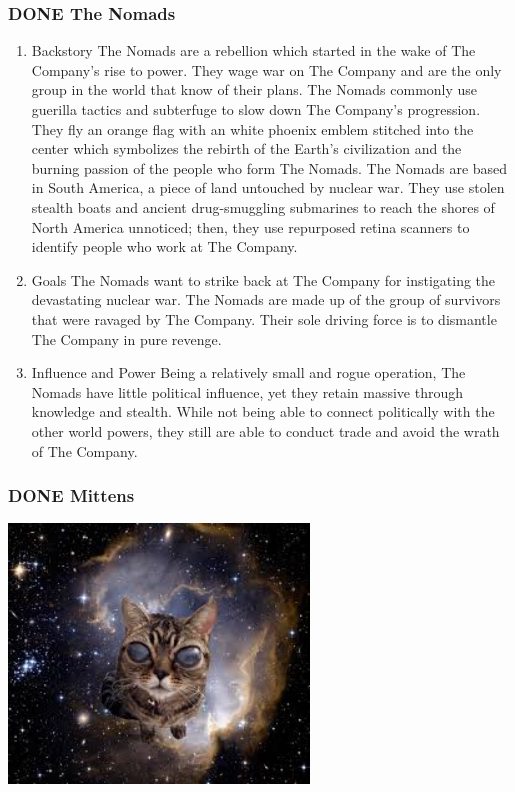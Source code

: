 \documentclass[11pt]{article}
\begin{document}
\subsubsection{{\bfseries\sffamily DONE} The Nomads}
\label{sec:org0b8d6bd}
\begin{enumerate}
\item Backstory
\label{sec:orgff65e6f}
The Nomads are a rebellion which started in the wake of The Company's rise to power. They wage war on The Company and are the only group in the world that know of their plans. The Nomads commonly use guerilla tactics and subterfuge to slow down The Company's progression. They fly an orange flag with an white phoenix emblem stitched into the center which symbolizes the rebirth of the Earth's civilization and the burning passion of the people who form The Nomads. The Nomads are based in South America, a piece of land untouched by nuclear war. They use stolen stealth boats and ancient drug-smuggling submarines to reach the shores of North America unnoticed; then, they use repurposed retina scanners to identify people who work at The Company.

\item Goals
\label{sec:orgcfc7736}
The Nomads want to strike back at The Company for instigating the devastating nuclear war. The Nomads are made up of the group of survivors that were ravaged by The Company. Their sole driving force is to dismantle The Company in pure revenge.

\item Influence and Power
\label{sec:orgecb33ef}
Being a relatively small and rogue operation, The Nomads have little political influence, yet they retain massive through knowledge and stealth. While not being able to connect politically with the other world powers, they still are able to conduct trade and avoid the wrath of The Company.
\end{enumerate}

\subsubsection{{\bfseries\sffamily DONE} Mittens}
\label{sec:orga6996e6}
\begin{center}
\includegraphics[width=8cm]{./img/mittens.png}
\end{center}
\end{document}
